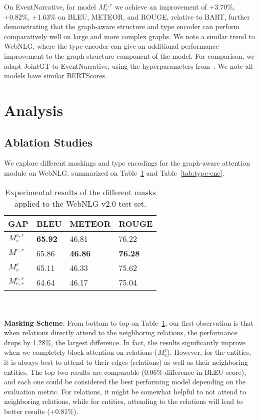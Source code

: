 \documentclass[11pt]{article}
\begin{document}
On EventNarrative, for model $ {}^{}_{}M^{e,r}_{e} $ we achieve an improvement of +3.70\%, +0.82\%, +1.63\% on BLEU, METEOR, and ROUGE, relative to BART, further demonstrating that the graph-aware structure and type encoder can perform comparatively well on large and more complex graphs. We note a similar trend to WebNLG, where the type encoder can give an additional performance improvement to the graph-structure component of the model. For comparison, we adapt JointGT to EventNarrative, using the hyperparameters from~\citet{ke-etal-2021-jointgt}. We note all models have similar BERTScores.

\section{Analysis}
\subsection{Ablation Studies}
We explore different maskings and type encodings for the graph-aware attention module on WebNLG. summarized on Table~\ref{tab:q-k choices} and Table~\ref{tab:type-enc}.
\begin{table}[]
\centering
\begin{tabular}{llll}
\hline
GAP & BLEU  & METEOR & ROUGE\\ \hline
$ {}^{}_{}M^{e,r}_{e} $   & \textbf{65.92} & 46.81  & 76.22\\ \hline
$ {}^{}_{}M^{e,r}_{} $   & 65.86 & \textbf{46.86}  & \textbf{76.28}\\ \hline
$ {}^{}_{}M^{e}_{e} $   & 65.11 & 46.33  & 75.62\\ \hline
$ {}^{}_{}M^{e,r}_{e,r} $   & 64.64 & 46.17  & 75.04\\ \hline
\end{tabular}
\caption{\label{tab:q-k choices} Experimental results of the different masks applied to the WebNLG v2.0 test set.}
\end{table}
\\\\
\textbf{Masking Scheme.} From bottom to top on Table~\ref{tab:q-k choices}, our first observation is that when relations directly attend to the neighboring relations, the performance drops by 1.28\%, the largest difference. In fact, the results significantly improve when we completely block attention on relations ($ {}^{}_{}M^{e}_{e} $). However, for the entities, it is always best to attend to their edges (relations) as well as their neighboring entities. The top two results are comparable (0.06\% difference in BLEU score), and each one could be considered the best performing model depending on the evaluation metric. For relations, it might be somewhat helpful to not attend to neighboring relations, while for entities, attending to the relations will lead to better results (+0.81\%).
\end{document}
